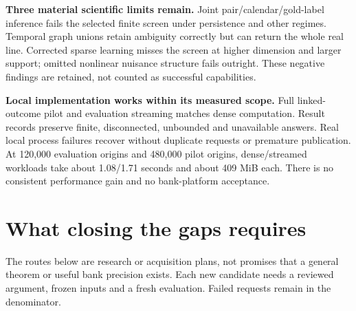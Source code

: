 \documentclass[11pt,a4paper]{article}
\begin{document}
\textbf{Three material scientific limits remain.}
Joint pair/calendar/gold-label inference fails the selected finite screen under persistence and other regimes. Temporal graph unions retain ambiguity correctly but can return the whole real line. Corrected sparse learning misses the screen at higher dimension and larger support; omitted nonlinear nuisance structure fails outright. These negative findings are retained, not counted as successful capabilities.

\textbf{Local implementation works within its measured scope.}
Full linked-outcome pilot and evaluation streaming matches dense computation. Result records preserve finite, disconnected, unbounded and unavailable answers. Real local process failures recover without duplicate requests or premature publication. At 120,000 evaluation origins and 480,000 pilot origins, dense/streamed workloads take about 1.08/1.71 seconds and about 409 MiB each. There is no consistent performance gain and no bank-platform acceptance.

\newpage
\section*{What closing the gaps requires}
The routes below are research or acquisition plans, not promises that a general theorem or useful bank precision exists. Each new candidate needs a reviewed argument, frozen inputs and a fresh evaluation. Failed requests remain in the denominator.
\end{document}
